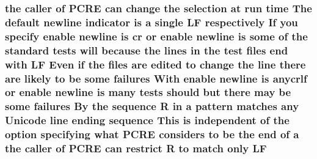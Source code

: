 \subsubsection[{\texorpdfstring{LF}{LF}}]{\setlength{\rightskip}{0pt plus 5cm}the caller {\bf of} {\bf P\+C\+RE} {\bf can} change the selection at {\bf run} {\bf time} The {\bf default} {\bf newline} indicator {\bf is} {\bf a} single LF {\bf respectively} If you specify enable {\bf newline} {\bf is} {\bf cr} {\bf or} enable {\bf newline} {\bf is} some {\bf of} the standard {\bf tests} will because the {\bf lines} {\bf in} the test {\bf files} {\bf end} {\bf with} LF Even {\bf if} the {\bf files} {\bf are} edited {\bf to} change the {\bf line} there {\bf are} likely {\bf to} {\bf be} some failures With enable {\bf newline} {\bf is} anycrlf {\bf or} enable {\bf newline} {\bf is} many {\bf tests} should but there may {\bf be} some failures By the {\bf sequence} {\bf R} {\bf in} {\bf a} {\bf pattern} {\bf matches} {\bf any} {\bf Unicode} {\bf line} ending {\bf sequence} This {\bf is} independent {\bf of} the {\bf option} {\bf specifying} {\bf what} {\bf P\+C\+RE} considers {\bf to} {\bf be} the {\bf end} {\bf of} {\bf a} the caller {\bf of} {\bf P\+C\+RE} {\bf can} restrict {\bf R} {\bf to} {\bf match} only LF}\hypertarget{README_8txt_a1fbb263d5d61cc65c4e250713adacd69}{}\label{README_8txt_a1fbb263d5d61cc65c4e250713adacd69}
